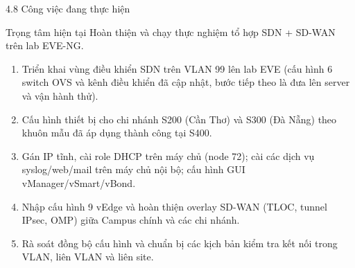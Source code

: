 \begin{frame}{4.8 Công việc đang thực hiện}
    \begin{block}{Trọng tâm hiện tại}
        Hoàn thiện và chạy thực nghiệm tổ hợp SDN + SD-WAN trên lab EVE-NG.
    \end{block}
    \vspace{0.15cm}
    \begin{enumerate}
        \item Triển khai vùng điều khiển SDN trên VLAN 99 lên lab EVE
              (cấu hình 6 switch OVS và kênh điều khiển đã cập nhật,
              bước tiếp theo là đưa lên server và vận hành thử).
        \vspace{0.12cm}
        \item Cấu hình thiết bị cho chi nhánh S200 (Cần Thơ) và
              S300 (Đà Nẵng) theo khuôn mẫu đã áp dụng thành công tại S400.
        \vspace{0.12cm}
        \item Gán IP tĩnh, cài role DHCP trên máy chủ (node 72); cài các
              dịch vụ syslog/web/mail trên máy chủ nội bộ; cấu hình GUI
              vManager/vSmart/vBond.
        \vspace{0.12cm}
        \item Nhập cấu hình 9 vEdge và hoàn thiện overlay SD-WAN (TLOC,
              tunnel IPsec, OMP) giữa Campus chính và các chi nhánh.
        \vspace{0.12cm}
        \item Rà soát đồng bộ cấu hình và chuẩn bị các kịch bản kiểm
              tra kết nối trong VLAN, liên VLAN và liên site.
    \end{enumerate}
\end{frame}

